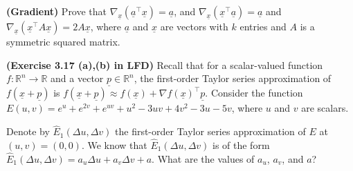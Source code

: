 \documentclass{article}
\renewcommand{\vec}[1]{\underline{#1}}
\newcommand{\vecx}{\vec{x}}
\theoremstyle{definition}
\begin{document}
\begin{question}[start=0]
\begin{question}
		\item \textbf{(Gradient)} Prove that $\nabla_{\!\vecx}(\vec{a}^\top \vecx) = \vec{a}$, and $\nabla_{\!\vecx}(\vec{x}^\top \vec{a}) = \vec{a}$ and $\nabla_{\!\vecx}(\vecx^\top A \vecx)=2A\vecx$, where $\vec{a}$ and $\vecx$ are vectors with $k$ entries and $A$ is a symmetric squared matrix.
		\item \textbf{(Exercise 3.17 (a),(b) in LFD)} Recall that for a scalar-valued function $f : \mathbb{R}^n \to \mathbb{R}$ and a vector $\underline{p} \in \mathbb{R}^n$, the first-order Taylor series approximation of $f(\vecx + \vec{p})$ is $f(\vecx + \vec{p}) \approx f(\vecx) + \nabla f(\vecx)^\top \vec{p}$. Consider the function $E(u, v) = e^u + e^{2v} + e^{uv} + u^2 - 3uv + 4v^2 - 3u - 5v$, where $u$ and $v$ are scalars.
		
		\begin{question}
			\item Denote by $\hat{E}_1(\Delta u, \Delta v)$ the first-order Taylor series approximation of $E$ at $(u, v) = (0, 0)$. We know that $\hat{E}_1(\Delta u, \Delta v)$ is of the form $\hat{E}_1(\Delta u, \Delta v) = a_u \Delta u + a_v \Delta v + a$. What are the values of $a_u$, $a_v$, and $a$?
			

\end{question}
\end{question}
\end{question}
\end{document}
